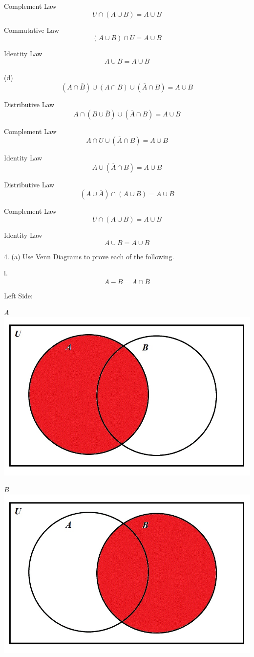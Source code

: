 \documentclass[10pt]{article}
\begin{document}
Complement Law
$$U \cap (A\cup B) = A \cup B$$

Commutative Law
$$(A\cup B) \cap U = A \cup B$$

Identity Law
$$A \cup B = A \cup B$$\\

(d)
$$(A \cap \overline{B}) \cup (A \cap B) \cup (\overline{A} \cap B) = A \cup B$$

Distributive Law
$$A \cap (B \cup \overline{B}) \cup (\overline{A} \cap B) = A \cup B$$

Complement Law
$$A \cap U \cup (\overline{A} \cap B) = A \cup B$$

Identity Law
$$A \cup (\overline{A} \cap B) = A \cup B$$

Distributive Law
$$(A \cup \overline{A}) \cap (A \cup B) = A \cup B$$

Complement Law
$$U \cap (A \cup B) = A \cup B$$

Identity Law
$$A\cup B = A \cup B$$

4. (a) Use Venn Diagrams to prove each of the following.

i.
$$A - B = A \cap \overline{B}$$

Left Side:

$A$\\
\includegraphics[scale=0.3]{9}

$B$\\
\includegraphics[scale=0.3]{10}
\end{document}
